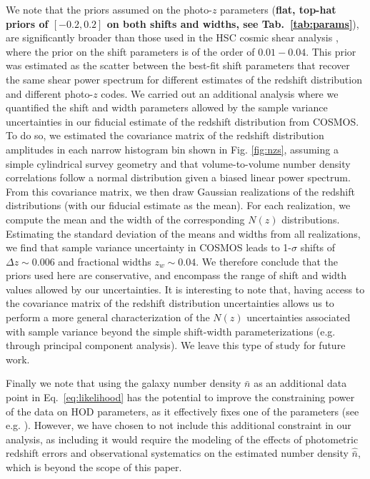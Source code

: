 \documentclass[a4paper,11pt]{article}
\newcommand{\rev}[1]{{\textbf{#1}}}
\begin{document}
We note that the priors assumed on the photo-$z$ parameters (\rev{flat, top-hat priors of $[-0.2, 0.2]$ on both shifts and widths, see Tab.~\ref{tab:params}}), are significantly broader than those used in the HSC cosmic shear analysis \cite{2019PASJ...71...43H}, where the prior on the shift parameters is of the order of $0.01-0.04$. This prior was estimated as the scatter between the best-fit shift parameters that recover the same shear power spectrum for different estimates of the redshift distribution and different photo-$z$ codes. We carried out an additional analysis where we quantified the shift and width parameters allowed by the sample variance uncertainties in our fiducial estimate of the redshift distribution from COSMOS. To do so, we estimated the covariance matrix of the redshift distribution amplitudes in each narrow histogram bin shown in Fig. \ref{fig:nzs}, assuming a simple cylindrical survey geometry and that volume-to-volume number density correlations follow a normal distribution given a biased linear power spectrum. From this covariance matrix, we then draw Gaussian realizations of the redshift distributions (with our fiducial estimate as the mean). For each realization, we compute the mean and the width of the corresponding $N(z)$ distributions. Estimating the standard deviation of the means and widths from all realizations, we find that sample variance uncertainty in COSMOS leads to 1-$\sigma$ shifts of $\Delta z\sim0.006$ and fractional widths $z_w\sim 0.04$. We therefore conclude that the priors used here are conservative, and encompass the range of shift and width values allowed by our uncertainties. It is interesting to note that, having access to the covariance matrix of the redshift distribution uncertainties  allows us to perform a more general characterization of the $N(z)$ uncertainties associated with sample variance beyond the simple shift-width parameterizations (e.g. through principal component analysis). We leave this type of study for future work.

Finally we note that using the galaxy number density $\bar{n}$ as an additional data point in Eq.~\ref{eq:likelihood} has the potential to improve the constraining power of the data on HOD parameters, as it effectively fixes one of the parameters (see e.g. \cite{Zhai:2017}). However, we have chosen to not include this additional constraint in our analysis, as including it would require the modeling of the effects of photometric redshift errors and observational systematics on the estimated number density $\hat{\bar{n}}$, which is beyond the scope of this paper.   
\end{document}
